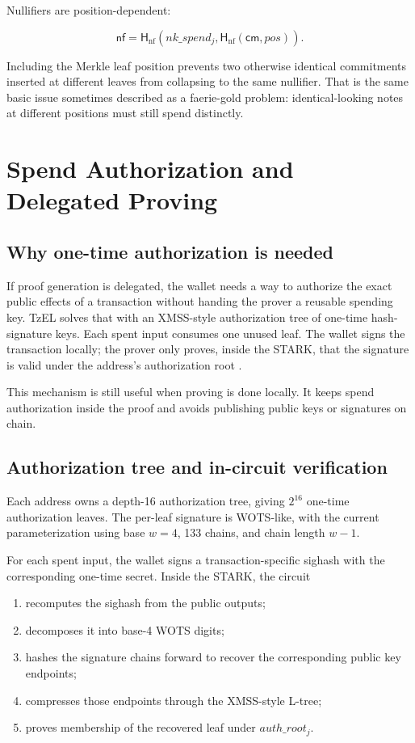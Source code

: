 \documentclass[11pt]{article}
\newcommand{\TzEL}{TzEL}
\newcommand{\Hash}{\mathsf{H}}
\newcommand{\cm}{\mathsf{cm}}
\newcommand{\nf}{\mathsf{nf}}
\begin{document}
Nullifiers are position-dependent:

\[
\nf = \Hash_{\mathrm{nf}}(nk\_spend_j, \Hash_{\mathrm{nf}}(\cm, pos)).
\]

Including the Merkle leaf position prevents two otherwise identical commitments
inserted at different leaves from collapsing to the same nullifier. That is the
same basic issue sometimes described as a faerie-gold problem: identical-looking
notes at different positions must still spend distinctly.

\section{Spend Authorization and Delegated Proving}

\subsection{Why one-time authorization is needed}

If proof generation is delegated, the wallet needs a way to authorize the exact
public effects of a transaction without handing the prover a reusable spending
key. \TzEL{} solves that with an XMSS-style authorization tree of one-time
hash-signature keys. Each spent input consumes one unused leaf. The wallet
signs the transaction locally; the prover only proves, inside the STARK, that
the signature is valid under the address's authorization root
\cite{rfc8391,xmss,wotsplus}.

This mechanism is still useful when proving is done locally. It keeps spend
authorization inside the proof and avoids publishing public keys or signatures
on chain.

\subsection{Authorization tree and in-circuit verification}

Each address owns a depth-16 authorization tree, giving \(2^{16}\) one-time
authorization leaves. The per-leaf signature is WOTS-like, with the current
parameterization using base \(w = 4\), 133 chains, and chain length \(w - 1\).

For each spent input, the wallet signs a transaction-specific sighash with the
corresponding one-time secret. Inside the STARK, the circuit

\begin{enumerate}
  \item recomputes the sighash from the public outputs;
  \item decomposes it into base-4 WOTS digits;
  \item hashes the signature chains forward to recover the corresponding public
        key endpoints;
  \item compresses those endpoints through the XMSS-style L-tree;
  \item proves membership of the recovered leaf under \(auth\_root_j\).
\end{enumerate}
\end{document}
